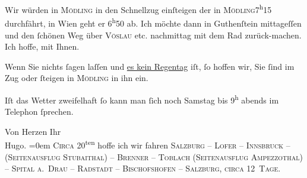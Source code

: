 \pstart
           Wir würden in \textsc{Mödling} in den Schnellzug einſteigen der in \textsc{Mödling}7\textsuperscript{h}15 durchfährt, in Wien geht er 6\textsuperscript{h}50 ab.
               Ich möchte dann in Guthenſtein mittageſſen {\pb}und den ſchönen Weg über \textsc{Vöslau} etc. nachmittag mit dem Rad zurück-machen. Ich hoffe, mit Ihnen.\pend
           
\pstart
           Wenn Sie nichts ſagen laſſen und \uline{es kein Regentag}
               iſt, ſo hoffen wir, Sie ſind im Zug oder ſteigen in \textsc{Mödling} in ihn ein.\pend
           
\pstart
           {\pb}Iſt das Wetter zweifelhaft ſo
               kann man ſich noch Samstag bis 9\textsuperscript{h} abends im Telephon ſprechen.\pend
           
\pstart
           Von Herzen Ihr{\\[\baselineskip]}\spacefill\mbox{Hugo.}\pend
           \leftskip=0em{}
\pstart
           \noindent{}\textsc{Circa} 20\textsuperscript{ten} hoffe ich wir
                  fahren \textsc{Salzburg – Lofer – Innsbruck – (Seitenausflug
                        Stubaithal) – Brenner – Toblach
                     (Seitenausflug Ampezzothal) – Spital a. Drau – Radstadt – Bischofshofen – Salzburg, circa
                     12 Tage}.\pend
           \endnumbering{}  
      